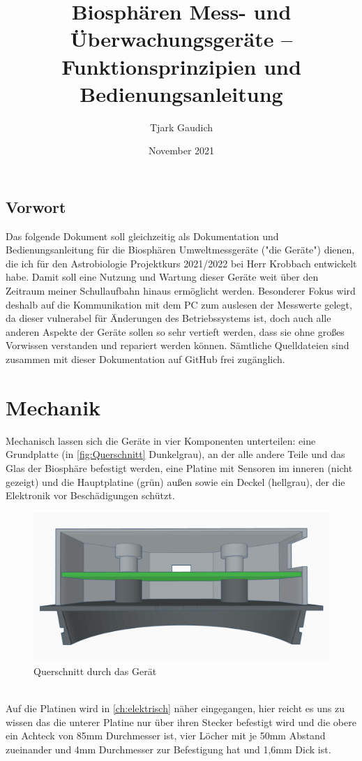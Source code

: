 \documentclass[12pt, a4paper, oneside]{report}
\title{\textbf{Biosphären Mess- und Überwachungsgeräte -- Funktionsprinzipien und Bedienungsanleitung}}
\author{Tjark Gaudich}
\date{November 2021}
\begin{document}
\maketitle

\section{Vorwort}
Das folgende Dokument soll gleichzeitig als Dokumentation und Bedienungsanleitung für die Biosphären Umweltmessgeräte ("die Geräte") dienen, die ich für den Astrobiologie Projektkurs 2021/2022 bei Herr Krobbach entwickelt habe. Damit soll eine Nutzung und Wartung dieser Geräte weit über den Zeitraum meiner Schullaufbahn hinaus ermöglicht werden. Besonderer Fokus wird deshalb auf die Kommunikation mit dem PC zum auslesen der Messwerte gelegt, da dieser vulnerabel für Änderungen des Betriebssystems ist, doch auch alle anderen Aspekte der Geräte sollen so sehr vertieft werden, dass sie ohne großes Vorwissen verstanden und repariert werden können. Sämtliche Quelldateien sind zusammen mit dieser Dokumentation auf 
GitHub\cite{Github} frei zugänglich.
\tableofcontents
\listoffigures

\chapter{Mechanik}

Mechanisch lassen sich die Geräte in vier Komponenten unterteilen:
eine Grundplatte (in \autoref{fig:Querschnitt} Dunkelgrau), an der alle andere Teile und das Glas der Biosphäre befestigt werden, eine Platine mit Sensoren im inneren (nicht gezeigt) und die Hauptplatine (grün) außen sowie ein Deckel (hellgrau), der die Elektronik vor Beschädigungen schützt.
\begin{figure}[h]
	\centering
	\includegraphics[width=1\textwidth]{Querschnitt}
	\caption{Querschnitt durch das Gerät}
	\label{fig:Querschnitt}
\end{figure}
\\Auf die Platinen wird in \autoref{ch:elektrisch} näher eingegangen, hier reicht es uns zu wissen das die unterer Platine nur über ihren Stecker befestigt wird und die obere ein Achteck von 85mm Durchmesser ist, vier Löcher mit je 50mm Abstand zueinander und 4mm Durchmesser zur Befestigung hat und 1,6mm Dick ist.
\end{document}
